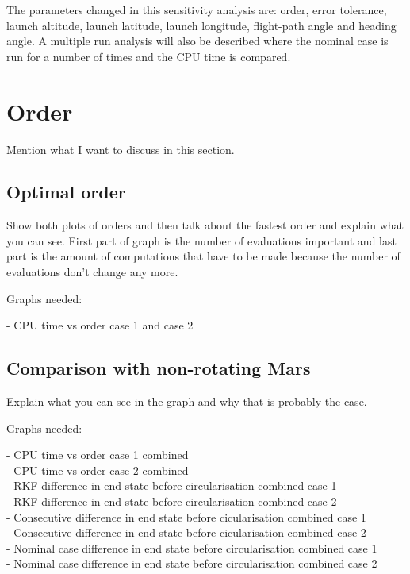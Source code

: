 The parameters changed in this sensitivity analysis are: order, error tolerance, launch altitude, launch latitude, launch longitude, flight-path angle and heading angle. A multiple run analysis will also be described where the nominal case is run for a number of times and the CPU time is compared. 


\section{Order}
\label{sec:order}
Mention what I want to discuss in this section.

\subsection{Optimal order}
\label{subsec:optimalOrder}
Show both plots of orders and then talk about the fastest order and explain what you can see. First part of graph is the number of evaluations important and last part is the amount of computations that have to be made because the number of evaluations don't change any more.

Graphs needed:

- CPU time vs order case 1 and case 2


\subsection{Comparison with non-rotating Mars}
\label{subsec:orderCompNotRot}

Explain what you can see in the graph and why that is probably the case.

Graphs needed:

- CPU time vs order case 1 combined \\
- CPU time vs order case 2 combined \\
- RKF difference in end state before circularisation combined case 1 \\ 
- RKF difference in end state before circularisation combined case 2 \\
- Consecutive difference in end state before cicularisation combined case 1 \\
- Consecutive difference in end state before cicularisation combined case 2 \\
- Nominal case difference in end state before circularisation combined case 1 \\
- Nominal case difference in end state before circularisation combined case 2 \\

